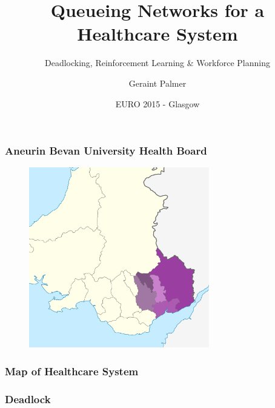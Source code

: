 \documentclass{beamer}
\title
{Queueing Networks for a Healthcare System}
\subtitle
{Deadlocking, Reinforcement Learning \& Workforce Planning}
\author{Geraint Palmer}
\date{EURO 2015 - Glasgow}
\begin{document}
\frame{\titlepage}


\begin{frame}
\frametitle{Aneurin Bevan University Health Board}
\begin{figure}
\includegraphics[width=0.7\textwidth]{Aneurin_Bevan}
\end{figure}
\end{frame}

\begin{frame}
\frametitle{Map of Healthcare System}
\begin{figure}

\end{figure}
\end{frame}

\begin{frame}
    
\end{frame}

\begin{frame}
    
\end{frame}

\begin{frame}
    \frametitle{Deadlock}
    \begin{figure}
    
    \end{figure}
\end{frame}
\end{document}
